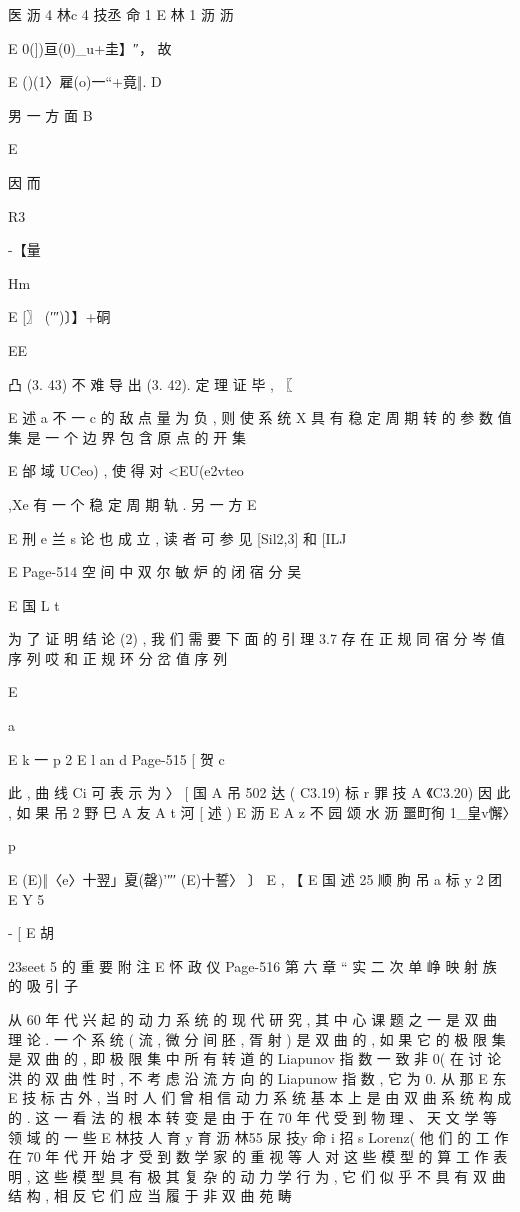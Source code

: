 {{{{{医 沥 4 林c 4 技丞
命 1
E 林
1 沥 沥

E 0(])亘(0)_u+圭】″，
故

E ()(1〉雇(o)一“+竟‖.
D

男 一 方 面
B

E

因 而

R3

-【量

Hm

E [〗 (′″)〕】+硐

EE

凸 (3. 43) 不 难 导 出 (3. 42). 定 理 证 毕 , 〖

E 述 a 不 一 c
的 敌 点 量 为 负 , 则 使 系 统 X 具 有 稳 定 周 期 转 的 参 数 值 集 是 一 个
边 界 包 含 原 点 的 开 集

E
邰 域 UCeo) , 使 得 对 <EU(e2vteo},Xe 有 一 个 稳 定 周 期 轨 . 另 一 方
E

E 刑 e 兰 s
论 也 成 立 , 读 者 可 参 见 [Sil2,3] 和 [ILJ

E
Page-514
空 间 中 双 尔 敏 炉 的 闭 宿 分 吴

E 国 L t

为 了 证 明 结 论 (2) , 我 们 需 要 下 面 的
引 理 3.7 存 在 正 规 同 宿 分 岑 值 序 列 哎 和 正 规 环 分 岔 值 序 列

E

a

E k 一 p 2
E l an
d
Page-515
[ 贺 c

此 , 曲 线 Ci 可 表 示 为
〉 [ 国 A 吊 502 达 ( C3.19)
标 r 罪
技
A 《C3.20)
因 此 , 如 果
吊 2
野
巳 A 友 A t 河
[ 述 )
E 沥
E A z 不 园
颂 水 沥
噩町徇 1_皇v懈〉

p

E (E)‖〈e〉十翌」夏(罄)'″′ (E)十誓〉 〕
E , 【
E 国 述 25 顺 朐 吊 a 标
y
2 团
E Y 5

- [
E 胡

23seet 5
的 重 要 附 注
E 怀 政 仪
Page-516
第 六 章 “ 实 二 次 单 峥 映 射 族 的 吸 引 子

从 60 年 代 兴 起 的 动 力 系 统 的 现 代 研 究 , 其 中 心 课 题 之 一 是 双
曲 理 论 . 一 个 系 统 ( 流 , 微 分 间 胚 , 胥 射 ) 是 双 曲 的 , 如 果 它 的 极 限
集 是 双 曲 的 , 即 极 限 集 中 所 有 转 道 的 Liapunov 指 数 一 致 非 0( 在 讨
论 洪 的 双 曲 性 时 , 不 考 虑 沿 流 方 向 的 Liapunow 指 数 , 它 为 0. 从 那
E 东
E 技 标
古 外 , 当 时 人 们 曾 相 信 动 力 系 统 基 本 上 是 由 双 曲 系 统 构 成 的 . 这 一
看 法 的 根 本 转 变 是 由 于 在 70 年 代 受 到 物 理 、 天 文 学 等 领 域 的 一 些
E 林技 人 育 y 育 沥 林55 尿 技y 命 i 招 s
Lorenz( 他 们 的 工 作 在 70 年 代 开 始 才 受 到 数 学 家 的 重 视 等 人 对
这 些 模 型 的 算 工 作 表 明 , 这 些 模 型 具 有 极 其 复 杂 的 动 力 学
行 为 , 它 们 似 乎 不 具 有 双 曲 结 构 , 相 反 它 们 应 当 履 于 非 双 曲 苑 畴

}}}}
